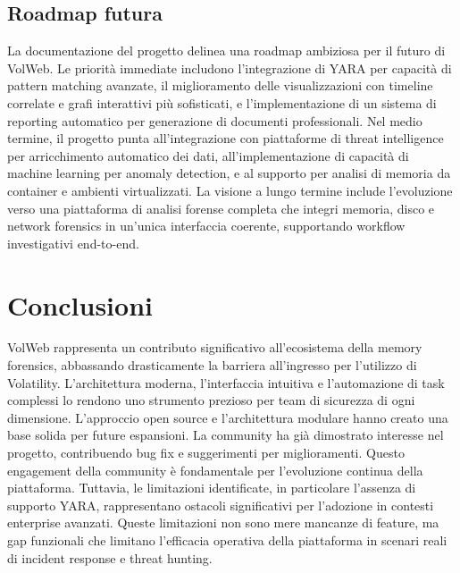 \subsection{Roadmap futura}
La documentazione del progetto delinea una roadmap ambiziosa per il futuro di VolWeb. Le priorità immediate includono l'integrazione di YARA per capacità di pattern matching avanzate, il miglioramento delle visualizzazioni con timeline correlate e grafi interattivi più sofisticati, e l'implementazione di un sistema di reporting automatico per generazione di documenti professionali.
Nel medio termine, il progetto punta all'integrazione con piattaforme di threat intelligence per arricchimento automatico dei dati, all'implementazione di capacità di machine learning per anomaly detection, e al supporto per analisi di memoria da container e ambienti virtualizzati.
La visione a lungo termine include l'evoluzione verso una piattaforma di analisi forense completa che integri memoria, disco e network forensics in un'unica interfaccia coerente, supportando workflow investigativi end-to-end.


\section{Conclusioni}
VolWeb rappresenta un contributo significativo all'ecosistema della memory forensics, abbassando drasticamente la barriera all'ingresso per l'utilizzo di Volatility. L'architettura moderna, l'interfaccia intuitiva e l'automazione di task complessi lo rendono uno strumento prezioso per team di sicurezza di ogni dimensione.
L'approccio open source e l'architettura modulare hanno creato una base solida per future espansioni. La community ha già dimostrato interesse nel progetto, contribuendo bug fix e suggerimenti per miglioramenti. Questo engagement della community è fondamentale per l'evoluzione continua della piattaforma.
Tuttavia, le limitazioni identificate, in particolare l'assenza di supporto YARA, rappresentano ostacoli significativi per l'adozione in contesti enterprise avanzati. Queste limitazioni non sono mere mancanze di feature, ma gap funzionali che limitano l'efficacia operativa della piattaforma in scenari reali di incident response e threat hunting.